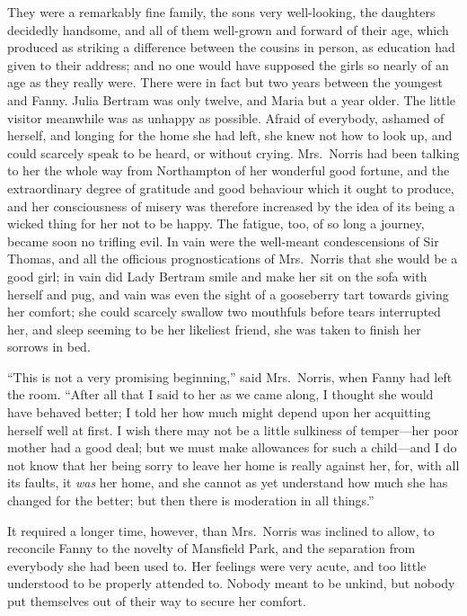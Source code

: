 \documentclass{article}
\begin{document}
They were a remarkably fine family, the sons very well-looking,
the daughters decidedly handsome, and all of them well-grown
and forward of their age, which produced as striking
a difference between the cousins in person, as education
had given to their address; and no one would have supposed
the girls so nearly of an age as they really were.  There were
in fact but two years between the youngest and Fanny.
Julia Bertram was only twelve, and Maria but a year older.
The little visitor meanwhile was as unhappy as possible.
Afraid of everybody, ashamed of herself, and longing
for the home she had left, she knew not how to look up,
and could scarcely speak to be heard, or without crying.
Mrs.\ Norris had been talking to her the whole way from
Northampton of her wonderful good fortune, and the
extraordinary degree of gratitude and good behaviour
which it ought to produce, and her consciousness of
misery was therefore increased by the idea of its being
a wicked thing for her not to be happy.  The fatigue,
too, of so long a journey, became soon no trifling evil.
In vain were the well-meant condescensions of Sir Thomas,
and all the officious prognostications of Mrs.\ Norris
that she would be a good girl; in vain did Lady Bertram
smile and make her sit on the sofa with herself and pug,
and vain was even the sight of a gooseberry tart towards
giving her comfort; she could scarcely swallow two mouthfuls
before tears interrupted her, and sleep seeming to be her
likeliest friend, she was taken to finish her sorrows in bed.

``This is not a very promising beginning,'' said Mrs.\ Norris,
when Fanny had left the room.  ``After all that I said to her
as we came along, I thought she would have behaved better;
I told her how much might depend upon her acquitting
herself well at first.  I wish there may not be a little
sulkiness of temper---her poor mother had a good deal;
but we must make allowances for such a child---and I
do not know that her being sorry to leave her home is
really against her, for, with all its faults, it \emph{was}
her home, and she cannot as yet understand how much she
has changed for the better; but then there is moderation
in all things.''

It required a longer time, however, than Mrs.\ Norris
was inclined to allow, to reconcile Fanny to the novelty
of Mansfield Park, and the separation from everybody
she had been used to.  Her feelings were very acute,
and too little understood to be properly attended to.
Nobody meant to be unkind, but nobody put themselves out
of their way to secure her comfort.
\end{document}
